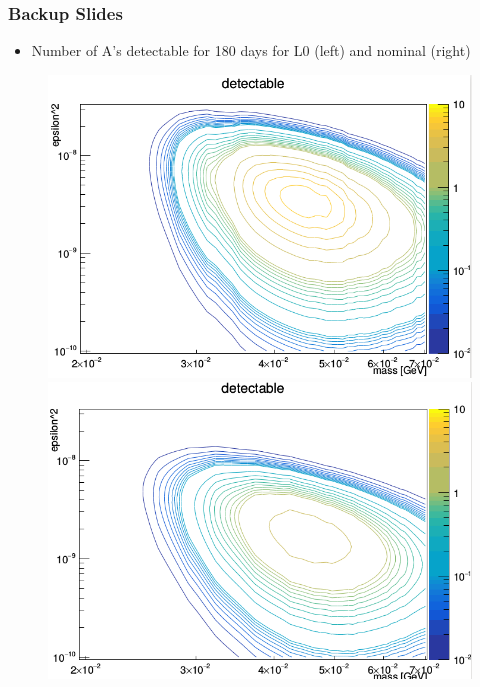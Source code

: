 \documentclass{beamer}
\begin{document}
\begin{frame}
\frametitle{Backup Slides}

\begin{itemize}
\item Number of A's detectable for 180 days for L0 (left) and nominal (right)
\end{itemize}

\begin{figure}
\includegraphics[width=0.5\linewidth]{figs/detectable_180_days_L0.png}
\includegraphics[width=0.5\linewidth]{figs/detectable_180_days_nom.png}
\end{figure}

\end{frame}

\end{document}
